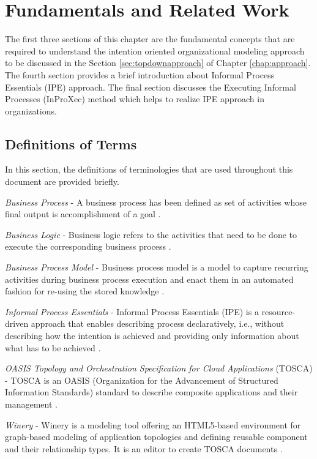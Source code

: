 \chapter{Fundamentals and Related Work}
\label{chap:fundamentals}
The first three sections of this chapter are the fundamental concepts that are required to understand the intention oriented organizational modeling approach to be discussed in the Section \ref{sec:topdownapproach} of Chapter \ref{chap:approach}. The fourth section provides a brief introduction about Informal Process Essentials (IPE) approach. The final section discusses the Executing Informal Processes (InProXec) method which helps to realize IPE approach in organizations.

\section{Definitions of Terms}
\label{sec:termdefinitions}
In this section, the definitions of terminologies that are used throughout this document are provided briefly.

\textit{Business Process} -  A business process has been defined as set of activities whose final output is accomplishment of a goal \cite{Weske2012}.  

\textit{Business Logic} - Business logic refers to the activities that need to be done to execute the corresponding business process \cite{Weske2012}. 

\textit{Business Process Model} - Business process model is a model to capture recurring activities during business process execution and enact them in an automated fashion for re-using the stored knowledge \cite{Weske2012}. 

\textit{Informal Process Essentials} - Informal Process Essentials (IPE) is a resource-driven approach that enables describing process declaratively, i.e., without describing how the intention is achieved and providing only information about what has to be achieved \cite{Sungur2014a}. 

\textit{OASIS Topology and Orchestration Specification for Cloud Applications} (TOSCA) - TOSCA is an OASIS (Organization for the Advancement of Structured Information Standards) standard to describe composite applications and their management \cite{Kopp2013}.  

\textit{Winery} - Winery is a modeling tool offering an HTML5-based environment for graph-based modeling of application topologies and defining reusable component and their relationship types. It is an editor to create TOSCA documents \cite{Kopp2013}. 

